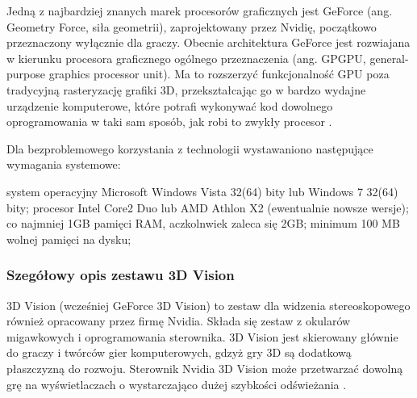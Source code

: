 Jedną z najbardziej znanych marek procesorów graficznych jest GeForce (ang. Geometry Force, siła geometrii), zaprojektowany przez Nvidię, początkowo przeznaczony wyłącznie dla graczy. Obecnie architektura GeForce jest rozwiajana w kierunku procesora graficznego ogólnego przeznaczenia (ang. GPGPU, general-purpose graphics processor unit). Ma to rozszerzyć funkcjonalność GPU poza tradycyjną rasteryzację grafiki 3D, przekształcając go w bardzo wydajne urządzenie komputerowe, które potrafi wykonywać kod dowolnego oprogramowania w taki sam sposób, jak robi to zwykły procesor \cite{GeForce}. 

Dla bezproblemowego korzystania z technologii wystawaniono następujące wymagania systemowe: 
\begin{itemize}
\itemi system operacyjny Microsoft Windows Vista 32(64) bity lub Windows 7 32(64) bity;
\itemi procesor  Intel Core2 Duo lub AMD Athlon X2 (ewentualnie nowsze wersje);
\itemi co najmniej 1GB pamięci RAM, aczkolnwiek zaleca się 2GB;
\itemi minimum 100 MB wolnej pamięci na dysku;
\end{itemize}

\subsubsection{Szegółowy opis zestawu 3D Vision}
3D Vision (wcześniej GeForce 3D Vision) to zestaw dla widzenia stereoskopowego również opracowany przez firmę Nvidia. Składa się zestaw z okularów migawkowych i oprogramowania sterownika. 3D Vision jest skierowany głównie do graczy i twórców gier komputerowych, gdzyż gry 3D są dodatkową płaszczyzną do rozwoju. Sterownik Nvidia 3D Vision może przetwarzać dowolną grę na wyświetlaczach o wystarczająco dużej szybkości odświeżania \cite{NvidiaInfo}. 

